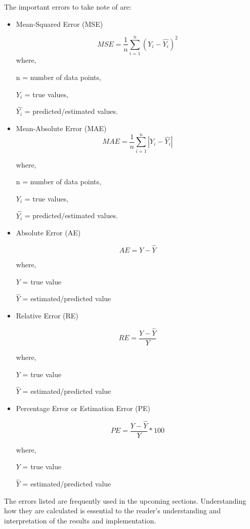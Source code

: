 \noindent The important errors to take note of are:
\begin{itemize}
    \item Mean-Squared Error (MSE) \cite{mse} 
    
    \begin{equation}
    MSE = \frac{1}{n}\sum^{n}_{i=1}(Y_{i}-\hat{Y_{i}})^2
    \end{equation}
    \noindent where, 
    
    n = number of data points, 
    
    $Y_i$ = true values, 
    
    $\hat{Y_i}$ = predicted/estimated values. 
    
    \item Mean-Absolute Error (MAE) \cite{mae}
    \begin{equation}
    MAE = \frac{1}{n}\sum^{n}_{i=1}|Y_{i}-\hat{Y_{i}}|
    \end{equation}
    
    \noindent where, 
    
    n = number of data points, 
    
    $Y_i$ = true values, 
    
    $\hat{Y_i}$ = predicted/estimated values. 
    
    \item Absolute Error (AE) \cite{abs}
    
    \begin{equation}
    AE = Y - \hat{Y}
    \end{equation}
    
    \noindent where, 
    
    $Y$ = true value 
    
    $\hat{Y}$ = estimated/predicted value 
    
    \item Relative Error (RE) \cite{rel}
    
    \begin{equation}
    RE = \frac{Y - \hat{Y}}{Y}
    \end{equation}
    
    \noindent where, 
    
    $Y$ = true value 
    
    $\hat{Y}$ = estimated/predicted value
    
    \item Percentage Error or Estimation Error (PE)
    \cite{markovsky}
    
    \begin{equation}
    PE = \frac{Y - \hat{Y}}{Y}*100
    \end{equation}
    
    \noindent where, 
    
    $Y$ = true value 
    
    $\hat{Y}$ = estimated/predicted value 
    
\end{itemize}

\noindent  The errors listed are frequently used in the upcoming sections. Understanding how they are calculated is essential to the reader's understanding and interpretation of the results and implementation. 

